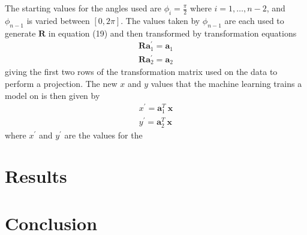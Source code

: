 \documentclass[a4paper,11pt,twoside]{article}
\begin{document}
The starting values for the angles used are $\phi_i=\frac{\pi}{2}$ where $i=1,\dotsc,n-2$, and $\phi_{n-1}$ is varied between $[0, 2\pi]$. The values taken by $\phi_{n-1}$ are each used to generate $\bm{R}$ in equation (19) and then transformed by transformation equations
\begin{equation}
\begin{split}
\bm{R} \bm{a}_1^{\prime} = \bm{a}_1
\\
\bm{R} \bm{a}_2^{\prime} = \bm{a}_2
\end{split}
\end{equation}
giving the first two rows of the transformation matrix used on the data to perform a projection. The new $x$ and $y$ values that the machine learning trains a model on is then given by
\begin{equation}
\begin{split}
x^{\prime}=\bm{a}_1^T \ \bm{x}
\\
y^{\prime}=\bm{a}_2^T \ \bm{x}
\end{split}
\end{equation}
where $x^{\prime}$ and $y^{\prime}$ are the values for the 
\newpage
\section{Results}

\newpage
\section{Conclusion}
\end{document}
